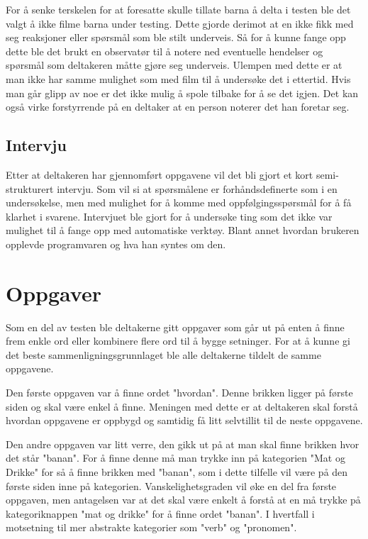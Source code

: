 For å senke terskelen for at foresatte skulle tillate barna å delta i testen ble det valgt å ikke filme barna under testing. Dette gjorde derimot at en ikke fikk med seg reaksjoner eller spørsmål som ble stilt underveis. Så for å kunne fange opp dette ble det brukt en observatør til å notere ned eventuelle hendelser og spørsmål som deltakeren måtte gjøre seg underveis. Ulempen med dette er at man ikke har samme mulighet som med film til å undersøke det i ettertid. Hvis man går glipp av noe er det ikke mulig å spole tilbake for å se det igjen. Det kan også virke forstyrrende på en deltaker at en person noterer det han foretar seg. 

 
\subsection{Intervju} 

Etter at deltakeren har gjennomført oppgavene vil det bli gjort et kort semi-strukturert intervju. Som vil si at spørsmålene er forhåndsdefinerte som i en undersøkelse, men med mulighet for å komme med oppfølgingsspørsmål for å få klarhet i svarene. Intervjuet ble gjort for å undersøke ting som det ikke var mulighet til å fange opp med automatiske verktøy. Blant annet hvordan brukeren opplevde programvaren og hva han syntes om den. 
 
\section{Oppgaver} 

Som en del av testen ble deltakerne gitt oppgaver som går ut på enten å finne frem enkle ord eller kombinere flere ord til å bygge setninger. For at å kunne gi det beste sammenligningsgrunnlaget ble alle deltakerne tildelt de samme oppgavene. 
 
Den første oppgaven var å finne ordet "hvordan". Denne brikken ligger på første siden og skal være enkel å finne. Meningen med dette er at deltakeren skal forstå hvordan oppgavene er oppbygd og samtidig få litt selvtillit til de neste oppgavene. 
 
Den andre oppgaven var litt verre, den gikk ut på at man skal finne brikken hvor det står "banan". For å finne denne må man trykke inn på kategorien "Mat og Drikke" for så å finne brikken med "banan", som i dette tilfelle vil være på den første siden inne på kategorien. Vanskelighetsgraden vil øke en del fra første oppgaven, men antagelsen var at det skal være enkelt å forstå at en må trykke på kategoriknappen "mat og drikke" for å finne ordet "banan". I hvertfall i motsetning til mer abstrakte kategorier som "verb" og "pronomen". 
 
